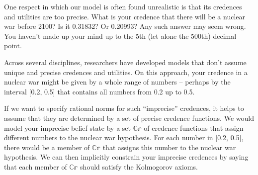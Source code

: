 

One respect in which our model is often found unrealistic is that its credences
and utilities are too precise. What is your credence that there will be a
nuclear war before 2100? Is it 0.31832? Or 0.20993? Any such answer may seem
wrong. You haven't made up your mind up to the 5th (let alone the 500th) decimal
point.

Across several disciplines, researchers have developed models that don't assume
unique and precise credences and utilities. On this approach, your credence in a
nuclear war might be given by a whole range of numbers -- perhaps by the
interval [0.2, 0.5] that contains all numbers from 0.2 up to 0.5.

If we want to specify rational norms for such ``imprecise'' credences, it helps
to assume that they are determined by a set of precise credence functions. We
would model your imprecise belief state by a set $\mathbb{C\!r}$ of credence
functions that assign different numbers to the nuclear war hypothesis. For each
number in [0.2, 0.5], there would be a member of $\mathbb{C\!r}$ that assigns this
number to the nuclear war hypothesis. We can then implicitly constrain your
imprecise credences by saying that each member of $\mathbb{C\!r}$ should satisfy
the Kolmogorov axioms.


